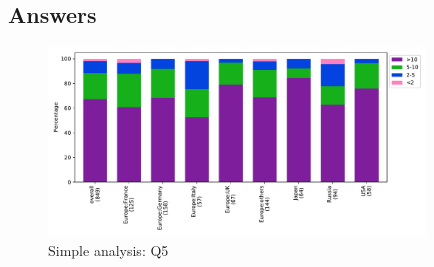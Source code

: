 
\subsection{Answers}


\begin{figure}[htb]
\begin{center}
\includegraphics[width=10cm]{../pdfs/Q5.pdf}
\caption{Simple analysis: Q5}
\label{fig:Q5}
\end{center}
\end{figure}
